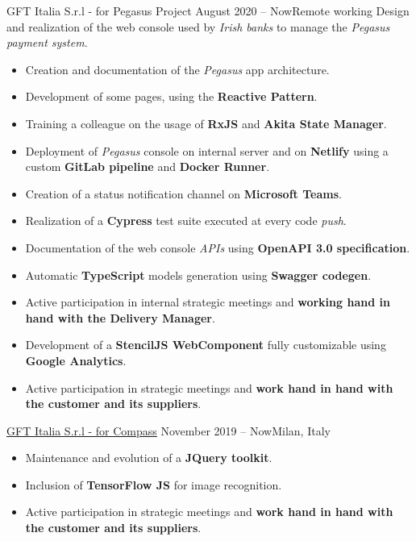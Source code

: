 \documentclass[10pt,a4paper]{altacv}
\begin{document}
{GFT Italia S.r.l - for Pegasus Project}
{August 2020 -- Now}{Remote working}
Design and realization of the web console used by \textit{Irish banks} to manage the \textit{Pegasus payment system}.
\newline
\begin{itemize}
	\item Creation and documentation of the \textit{Pegasus} app architecture.
	\item Development of some pages, using the \textbf{Reactive Pattern}.
	\item Training a colleague on the usage of \textbf{RxJS} and \textbf{Akita State Manager}.
	\item Deployment of \textit{Pegasus} console on internal server and on \textbf{Netlify} using a custom \textbf{GitLab pipeline} and \textbf{Docker Runner}.
	\item Creation of a status notification channel on \textbf{Microsoft Teams}.
	\item Realization of a \textbf{Cypress} test suite executed at every code \textit{push}.
	\item Documentation of the web console \textit{APIs} using \textbf{OpenAPI 3.0 specification}.
	\item Automatic \textbf{TypeScript} models generation using \textbf{Swagger codegen}.
	\item Active participation in internal strategic meetings and \textbf{working hand in hand with the Delivery Manager}.
\end{itemize}
\divider

{\marginpar{\vspace*{-3em}\raggedright}}
\begin{itemize}
	\item Development of a \textbf{StencilJS WebComponent} fully customizable using \textbf{Google Analytics}.
	\item Active participation in strategic meetings and \textbf{work hand in hand with the customer and its suppliers}.
\end{itemize}

\divider

{\href{https://www.compass.it/}{GFT Italia S.r.l - for Compass}}
{November 2019 -- Now}{Milan, Italy}
\begin{itemize}
	\item Maintenance and evolution of a \textbf{JQuery toolkit}.
	\item Inclusion of \textbf{TensorFlow JS} for image recognition.
	\item Active participation in strategic meetings and \textbf{work hand in hand with the customer and its suppliers}.
\end{itemize}
\end{document}
